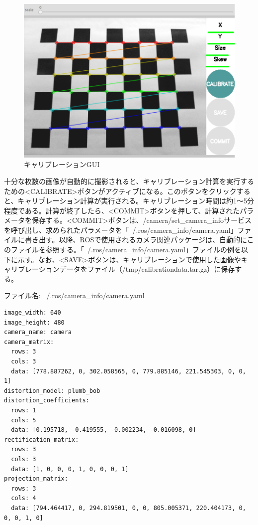 \begin{figure}[ht]
  \centering
  \includegraphics[width=\columnwidth]{pictures/chapter8/pic_08_07.png}
  \caption{キャリブレーションGUI}
\end{figure}

十分な枚数の画像が自動的に撮影されると、キャリブレーション計算を実行するための<CALIBRATE>ボタンがアクティブになる。このボタンをクリックすると、キャリブレーション計算が実行される。キャリブレーション時間は約1〜5分程度である。計算が終了したら、<COMMIT>ボタンを押して、計算されたパラメータを保存する。<COMMIT>ボタンは、/camera/set\_camera\_infoサービスを呼び出し、求められたパラメータを「~/.ros/camera\_info/camera.yaml」ファイルに書き出す。以降、ROSで使用されるカメラ関連パッケージは、自動的にこのファイルを参照する。「~/.ros/camera\_info/camera.yaml」ファイルの例を以下に示す。なお、<SAVE>ボタンは、キャリブレーションで使用した画像やキャリブレーションデータをファイル（/tmp/calibrationdata.tar.gz）に保存する。

ファイル名: ~/.ros/camera\_info/camera.yaml
\begin{lstlisting}[language=ROS]
image_width: 640
image_height: 480
camera_name: camera
camera_matrix:
  rows: 3
  cols: 3
  data: [778.887262, 0, 302.058565, 0, 779.885146, 221.545303, 0, 0, 1]
distortion_model: plumb_bob
distortion_coefficients:
  rows: 1
  cols: 5
  data: [0.195718, -0.419555, -0.002234, -0.016098, 0]
rectification_matrix:
  rows: 3
  cols: 3
  data: [1, 0, 0, 0, 1, 0, 0, 0, 1]
projection_matrix:
  rows: 3
  cols: 4
  data: [794.464417, 0, 294.819501, 0, 0, 805.005371, 220.404173, 0, 0, 0, 1, 0]
\end{lstlisting}

